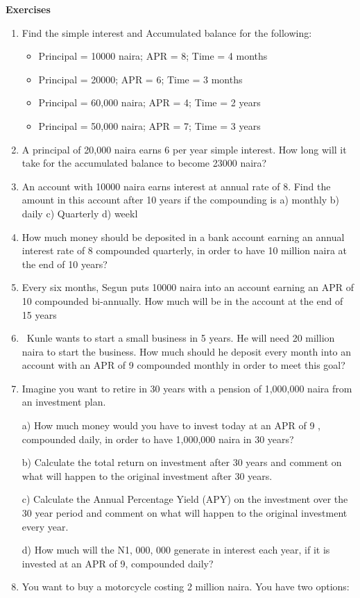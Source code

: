 \documentclass{article}
\begin{document}
\begin{center}
	\textbf{Exercises}
\end{center}
\begin{enumerate}
	\item Find the simple interest and Accumulated balance for the following:
	\begin{itemize}
		\item Principal = 10000 naira; APR = 8; Time = 4 months
		\item Principal = 20000; APR = 6; Time = 3 months
		\item Principal = 60,000 naira; APR = 4; Time = 2 years
		\item Principal = 50,000 naira; APR = 7; Time = 3 years
	\end{itemize}
\item A principal of 20,000 naira earns 6 per year simple interest. How long will it take for the accumulated balance to become 23000 naira?

\item An account with 10000 naira earns interest at annual rate of  8. Find the amount in this account after 10 years if the compounding is   a) monthly    b) daily     c) Quarterly   d) weekl

\item How much money should be deposited in a bank account earning an annual interest rate of 8 compounded quarterly, in order to have 10 million naira at the end of 10 years?

\item Every six months, Segun puts 10000 naira into an account earning an APR of 10 compounded bi-annually. How much will be in the account at the end of 15 years

\item  Kunle wants to start a small business in 5 years. He will need 20 million naira to start the business. How much should he deposit every month into an account with an APR of 9 compounded monthly in order to meet this goal?

\item Imagine you want to retire in 30 years with a pension of 1,000,000 naira from an investment plan.


a) How much money would you have to invest today at an APR of 9 , compounded daily, in order to have 1,000,000 naira in 30 years?

b) Calculate the total return on investment after 30 years and comment on what will happen to the original investment after 30 years. 

c) Calculate the Annual Percentage Yield (APY) on the investment over the 30 year period and comment on what will happen to the original investment every year.  

d) How much will the N1, 000, 000 generate in interest each year, if it is invested at an APR of 9, compounded daily? 

\item You want to buy a motorcycle costing 2 million naira. You have two options:

\end{enumerate}
\end{document}
